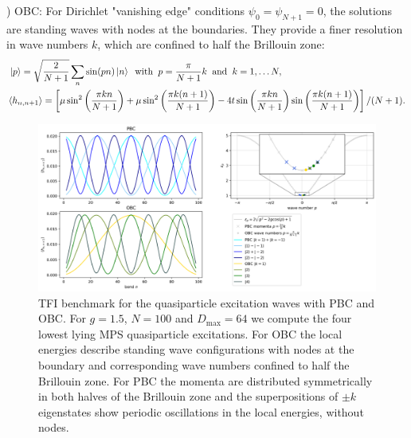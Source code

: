\vspace*{1em}
) OBC: For Dirichlet "vanishing edge" conditions $\psi_0 = \psi_{N+1} = 0$, the solutions are standing waves with nodes at the boundaries. They provide a finer resolution in wave numbers $k$, which are confined to half the Brillouin zone:
\begin{align*}
	& \ket{p} = \sqrt{\frac{2}{N+1}} \sum_n \sin(pn) \ket{n} \:\text{ with }\: p = \frac{\pi}{N+1} k \:\text{ and }\: k = 1, \ldots N, \\
	& \langle h_{n, n+1} \rangle 
	= \left[ 
	 \mu \sin^2 \left( \frac{\pi k n}{N+1} \right) 
	+ \mu \sin^2 \left(  \frac{\pi k (n+1)}{N+1} \right) 
	- 4t \sin \left( \frac{\pi k n}{N+1} \right) \sin \left( \frac{\pi k (n+1)}{N+1} \right)
	\right] / (N+1).
\end{align*}

\begin{figure}[H]
  \centering
  \includegraphics[width=1.0\linewidth]{excitations_local_energies.png}
  \caption{TFI benchmark for the quasiparticle excitation waves with PBC and OBC. For $g = 1.5$, $N = 100$ and $D_{\text{max}} = 64$ we compute the four lowest lying MPS quasiparticle excitations. For OBC the local energies describe standing wave configurations with nodes at the boundary and corresponding wave numbers confined to half the Brillouin zone. For PBC the momenta are distributed symmetrically in both halves of the Brillouin zone and the superpositions of $\pm k$ eigenstates show periodic oscillations in the local energies, without nodes.}
 \label{fig:excitations_local_energies}
\end{figure}

